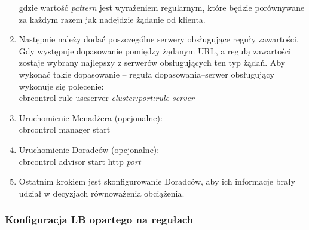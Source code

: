 \begin{enumerate}
    gdzie wartość \emph{pattern} jest wyrażeniem regularnym, które będzie porównywane za każdym razem jak
    nadejdzie żądanie od klienta.
    \item Następnie należy dodać poszczególne serwery obsługujące reguły zawartości. Gdy występuje dopasowanie
    pomiędzy żądanym URL, a regułą zawartości zostaje wybrany najlepszy z serwerów obsługujących ten typ
    żądań. Aby wykonać takie dopasowanie -- reguła dopasowania--serwer obsługujący wykonuje się polecenie:\\
    
    cbrcontrol rule useserver \emph{cluster:port:rule server}\\
    
    \item Uruchomienie Menadżera (opcjonalne):\\
    
    cbrcontrol manager start\\

    \item Uruchomienie Doradców (opcjonalne):\\

    cbrcontrol advisor start http \emph{port}

    \item Ostatnim krokiem jest skonfigurowanie Doradców, aby ich informacje brały udział w decyzjach równoważenia
    obciążenia.
    
    \end{enumerate}

\subsubsection{Konfiguracja LB opartego na regułach}

